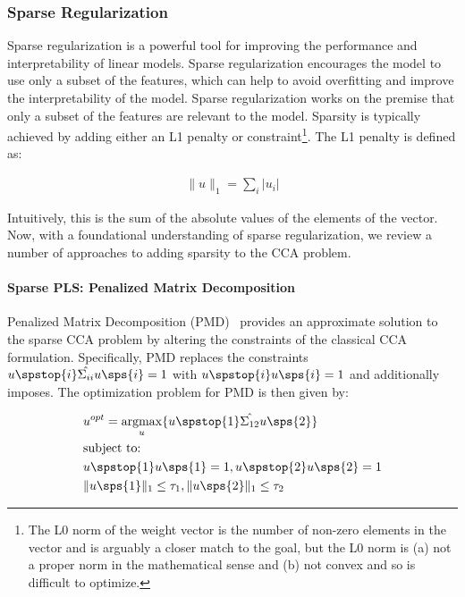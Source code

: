 \subsubsection{Sparse Regularization}

Sparse regularization is a powerful tool for improving the performance and interpretability of linear models.
Sparse regularization encourages the model to use only a subset of the features, which can help to avoid overfitting and improve the interpretability of the model.
Sparse regularization works on the premise that only a subset of the features are relevant to the model.
Sparsity is typically achieved by adding either an L1 penalty or constraint\footnote{The L0 norm of the weight vector is the number of non-zero elements in the vector and is arguably a closer match to the goal, but the L0 norm is (a) not a proper norm in the mathematical sense and (b) not convex and so is difficult to optimize.}.
The L1 penalty is defined as:

\begin{align}
    \|u\|_1 = \sum_i |u_i|
\end{align}

Intuitively, this is the sum of the absolute values of the elements of the vector.
Now, with a foundational understanding of sparse regularization, we review a number of approaches to adding sparsity to the CCA problem.

\paragraph{Sparse PLS: Penalized Matrix Decomposition}
Penalized Matrix Decomposition (PMD)~\citep{witten2009penalized} provides an approximate solution to the sparse CCA problem by altering the constraints of the classical CCA formulation.
Specifically, PMD replaces the constraints \(u\spstop{i} \hat{\Sigma_{ii}} u\sps{i} = 1\) with \(u\spstop{i} u\sps{i}= 1\) and additionally imposes.
The optimization problem for PMD is then given by:

\begin{align}
    & u^{opt}=\underset{u}{\mathrm{argmax}}\{ u\spstop{1} \hat{\Sigma_{12}} u\sps{2} \} \\
    & \text{subject to:} \notag \\
    & u\spstop{1} u\sps{1} = 1 , u\spstop{2} u\sps{2} = 1 \notag \\
    & \|u\sps{1}\|_1 \leq \tau_1 , \|u\sps{2}\|_1 \leq \tau_2 \notag
\end{align}

